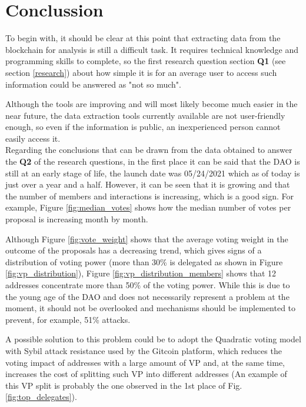 \documentclass[MSE,Master,english]{twbook}%
\begin{document}
\chapter{Conclussion\label{conclussion}}

To begin with, it should be clear at this point that extracting data from the blockchain for analysis is still a difficult task. It requires technical knowledge and programming skills to complete, so the first research question section \textbf{Q1} (see section \ref{research}) about how simple it is for an average user to access such information could be answered as "not so much".

Although the tools are improving and will most likely become much easier in the near future, the data extraction tools currently available are not user-friendly enough, so even if the information is public, an inexperienced person cannot easily access it. \\

Regarding the conclusions that can be drawn from the data obtained to answer the \textbf{Q2} of the research questions, in the first place it can be said that the DAO is still at an early stage of life, the launch date was 05/24/2021 which as of today is just over a year and a half. However, it can be seen that it is growing and that the number of members and interactions is increasing, which is a good sign. For example, Figure \ref{fig:median_votes} shows how the median number of votes per proposal is increasing month by month.

Although Figure \ref{fig:vote_weight} shows that the average voting weight in the outcome of the proposals has a decreasing trend, which gives signs of a distribution of voting power (more than 30\% is delegated as shown in Figure \ref{fig:vp_distribution}), Figure \ref{fig:vp_distribution_members} shows that 12 addresses concentrate more than 50\% of the voting power. While this is due to the young age of the DAO and does not necessarily represent a problem at the moment, it should not be overlooked and mechanisms should be implemented to prevent, for example, 51\% attacks\cite{51PercentAttack}. 

A possible solution to this problem could be to adopt the Quadratic voting model with Sybil attack resistance used by the Gitcoin platform\cite{gitcoin}, which reduces the voting impact of addresses with a large amount of VP and, at the same time, increases the cost of splitting such VP into different addresses (An example of this VP split is probably the one observed in the 1st place of Fig. \ref{fig:top_delegates}). \\
\end{document}
